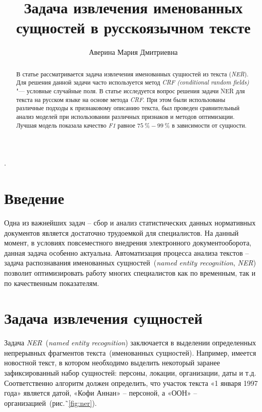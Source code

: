 \documentclass{csmathnotes}
\title{Задача извлечения именованных сущностей в русскоязычном тексте}
\author{Аверина Мария Дмитриевна}
\affiliation{Ярославский государственный университет им. П.\,Г. Демидова}
\begin{document}
\maketitle

\begin{abstract}
В статье рассматривается задача извлечения именованных сущностей из текста (\emph{NER}).
Для решения данной задачи часто используется метод \emph{CRF (conditional random fields)} "--- условные случайные поля.
В статье исследуется вопрос решения задачи NER для текста на русском языке на основе метода \emph{CRF}.
При этом были использованы различные подходы к признаковому описанию текста,
был проведен сравнительный анализ моделей при использовании различных признаков и методов оптимизации.
Лучшая модель показала качество \emph{F1} равное $75~\% - 99~\%$ в зависимости от сущности.
\end{abstract}

.

\section*{Введение}
Одна из важнейших задач – сбор и анализ статистических данных нормативных
документов является достаточно трудоемкой для специалистов. На данный момент, в условиях повсеместного внедрения электронного документооборота, данная задача особенно актуальна. Автоматизация процесса анализа текстов – задача распознавания именованных сущностей~(\emph{named entity recognition}, \emph{NER})~\cite{base} позволит оптимизировать работу многих специалистов как по временным, так и по качественным показателям.


\section*{Задача извлечения сущностей}

Задача \emph{NER}~(\emph{named entity recognition}) заключается в выделении определенных непрерывных фрагментов текста~(именованных сущностей).
Например, имеется новостной текст, в котором необходимо выделить некоторый заранее зафиксированный набор сущностей: персоны, локации, организации, даты и т.д.
Соответственно алгоритм должен определить, что участок текста «1 января 1997 года» является датой, «Кофи Аннан» – персоной, а «ООН» – организацией~(рис.˜\ref{fig:ner}).
\end{document}
